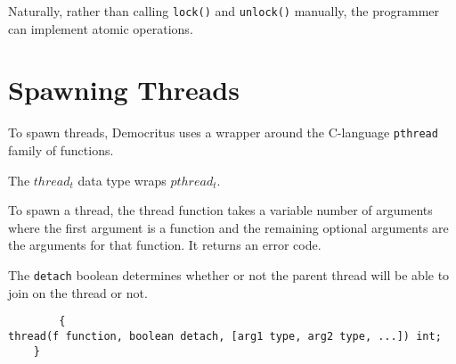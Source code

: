 		Naturally, rather than calling \texttt{lock()} and \texttt{unlock()} manually, the programmer can implement atomic operations.

	\section{Spawning Threads}
		To spawn threads, Democritus uses a wrapper around the C-language \texttt{pthread} family of functions.

		The \texttt{$thread_t$} data type wraps \texttt{$pthread_t$}.

		To spawn a thread, the thread function takes a variable number of arguments where the first argument is a function and the remaining optional arguments are the arguments for that function. It returns an error code.

		The \texttt{detach} boolean determines whether or not the parent thread will be able to join on the thread or not.
		\begin{lstlisting}
        {	
thread(f function, boolean detach, [arg1 type, arg2 type, ...]) int;
	}
		\end{lstlisting}
